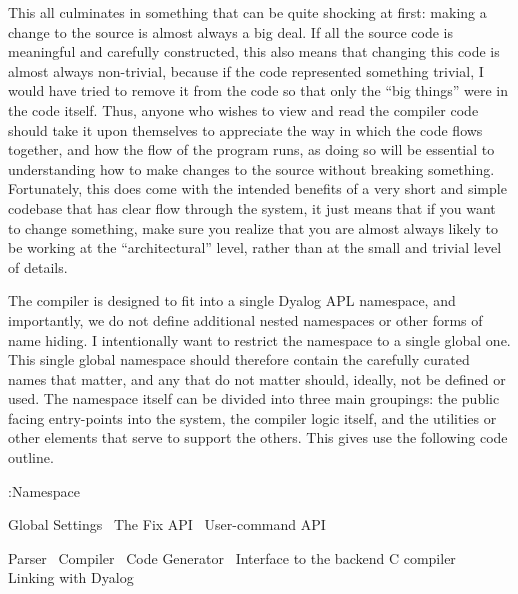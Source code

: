 \documentclass{article}%
\begin{document}
This all culminates in something that can be quite shocking at first:
making a change to the source is almost always a big deal.
If all the source code is meaningful and carefully constructed,
this also means that changing this code is almost always 
non-trivial, because if the code represented something trivial,
I would have tried to remove it from the code so that only the 
``big things'' were in the code itself.
Thus, anyone who wishes to view and read the compiler code should
take it upon themselves to appreciate the way in which the code flows
together,
and how the flow of the program runs, 
as doing so will be essential to understanding how to make changes to 
the source without breaking something.
Fortunately, this does come with the intended benefits of a very 
short and simple codebase that has clear flow through the system,
it just means that if you want to change something, 
make sure you realize that you are almost always likely to be working
at the ``architectural'' level, rather than at the small and trivial
level of details.

The compiler is designed to fit into a single Dyalog APL namespace,
and importantly, we do not define additional nested namespaces or 
other forms of name hiding. 
I intentionally want to restrict the namespace to a single global one.
This single global namespace should therefore contain the carefully 
curated names that matter, and any that do not matter should, ideally,
not be defined or used.
The namespace itself can be divided into three main groupings:
the public facing entry-points into the system,
the compiler logic itself,
and the utilities or other elements that serve to support the others.
This gives use the following code outline.

\nwenddocs{}\endmoddef\nwstartdeflinemarkup\nwenddeflinemarkup
:Namespace 

        \LA{}Global Settings~{\nwtagstyle{}}\RA{}
        \LA{}The Fix API~{\nwtagstyle{}}\RA{}
        \LA{}User-command API~{\nwtagstyle{}}\RA{}

        \LA{}Parser~{\nwtagstyle{}}\RA{}
        \LA{}Compiler~{\nwtagstyle{}}\RA{}
        \LA{}Code Generator~{\nwtagstyle{}}\RA{}
        \LA{}Interface to the backend C compiler~{\nwtagstyle{}}\RA{}
        \LA{}Linking with Dyalog~{\nwtagstyle{}}\RA{}
\end{document}
